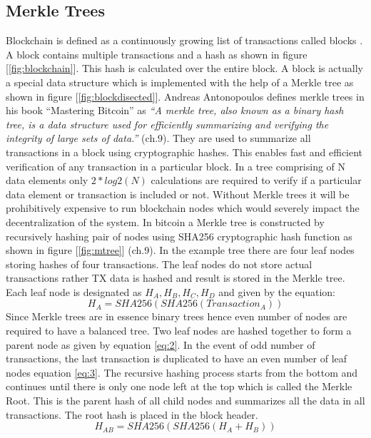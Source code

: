 \subsection{Merkle Trees}
Blockchain is defined as a continuously growing list of transactions called blocks \cite{wiki:001}. A block contains multiple transactions and a hash as shown in figure [\ref{fig:blockchain}]. This hash is calculated over the entire block. A block is actually a special data structure which is implemented with the help of a Merkle tree as shown in figure [\ref{fig:blockdisected}]. Andreas Antonopoulos defines merkle trees in his book “Mastering Bitcoin” as \textit{“A merkle tree, also known as a binary hash tree, is a data structure used for efficiently summarizing and verifying the integrity of large sets of data.”} \cite{andy_mb} (ch.9). They are used to summarize all transactions in a block using cryptographic hashes. This enables fast and efficient verification of any transaction in a particular block. In a tree comprising of N data elements only \(2*log2 (N)\) calculations are required to verify if a particular data element or transaction is included or not. Without Merkle trees it will be prohibitively expensive to run blockchain nodes which would severely impact the decentralization of the system. 
In bitcoin a Merkle tree is constructed by recursively hashing pair of nodes using SHA256 cryptographic hash function as shown in figure [\ref{fig:mtree}] \cite{andy_mb} (ch.9).  In the example tree there are four leaf nodes storing hashes of four transactions. The leaf nodes do not store actual transactions rather TX data is hashed and result is stored in the Merkle tree. Each leaf node is designated as \( H_{A}, H_{B}, H_{C}, H_{D} \) and given by the equation: \[ H_{A} = SHA256(SHA256(Transaction_{A}))\]
Since Merkle trees are in essence binary trees hence even number of nodes are required to have a balanced tree. Two leaf nodes are hashed together to form a parent node as given by equation \eqref{eq:2}. In the event of odd number of transactions, the last transaction is duplicated to have an even number of leaf nodes equation \eqref{eq:3}. The recursive hashing process starts from the bottom and continues until there is only one node left at the top which is called the Merkle Root. This is the parent hash of all child nodes and summarizes all the data in all transactions. The root hash is placed in the block header.
\begin{equation}
  \label{eq:2}
H_{AB} = SHA256(SHA256(H_{A} + H_{B}))
\end{equation}

